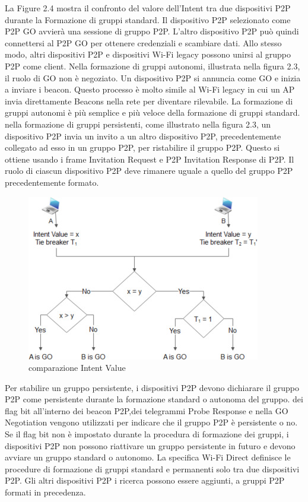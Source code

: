 La Figure 2.4 mostra il confronto del valore
dell'Intent tra due dispositivi P2P durante la Formazione di gruppi 
standard. Il dispositivo P2P selezionato come P2P GO avvierà una
sessione di gruppo P2P. L'altro dispositivo P2P può quindi
connettersi al P2P GO per ottenere credenziali e scambiare
dati. Allo stesso modo, altri dispositivi P2P e dispositivi
Wi-Fi legacy possono unirsi al gruppo P2P come client. Nella
formazione di gruppi autonomi, illustrata nella figura 2.3,
il ruolo di GO non è negoziato. Un dispositivo P2P 
si annuncia come GO e inizia a inviare i beacon. Questo
processo è molto simile al Wi-Fi legacy in cui un AP 
invia direttamente Beacons nella rete per diventare
rilevabile. La formazione di gruppi autonomi è più
semplice e più veloce della formazione di gruppi
standard. nella formazione di gruppi persistenti, come illustrato 
nella figura 2.3, un dispositivo P2P invia un invito
a un altro dispositivo P2P, precedentemente collegato
ad esso in un gruppo P2P, per ristabilire il gruppo P2P. 
Questo si ottiene usando i frame Invitation Request e P2P
Invitation Response di P2P. Il ruolo di ciascun dispositivo
P2P deve rimanere uguale a quello del gruppo P2P precedentemente
formato. 
\begin{figure}
\centering
\caption{comparazione Intent Value}
\includegraphics[width=0.9\columnwidth]{imgs/intentValueComparison.jpg} %

\end{figure}
Per stabilire un gruppo persistente, i dispositivi P2P
devono dichiarare il gruppo P2P come persistente durante la formazione
standard o autonoma del gruppo.
dei flag bit all'interno dei beacon P2P,dei telegrammi Probe 
Response e nella GO Negotiation vengono utilizzati 
per indicare che il gruppo P2P è persistente o no. 
Se il flag bit non è impostato durante la procedura di formazione dei
gruppi, i dispositivi P2P non possono riattivare un gruppo persistente
in futuro e devono avviare un gruppo standard o autonomo. La specifica
Wi-Fi Direct \cite{alliance2016wi} definisce le procedure di formazione di
gruppi standard
e permanenti solo tra due dispositivi P2P. Gli altri dispositivi P2P i ricerca
possono essere aggiunti, a gruppi P2P formati in precedenza.



